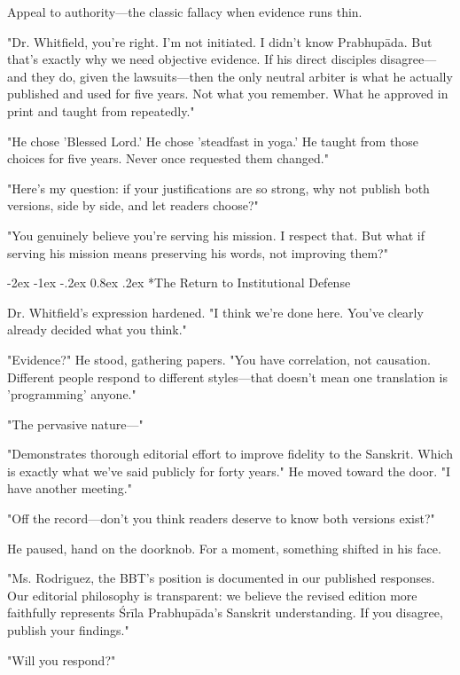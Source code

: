 \documentclass[12pt,twoside]{book}
\makeatletter
\let\oldsubsection\subsection
\renewcommand{\subsection}[1]{\needspace{3\baselineskip}\oldsubsection{#1}}
\renewcommand\subsection{\@startsection{subsection}{2}{\z@}%
{-2ex \@plus -1ex \@minus -.2ex}%
{0.8ex \@plus .2ex}%
{\normalfont\large\bfseries}}
\makeatother
\begin{document}
Appeal to authority—the classic fallacy when evidence runs thin.

"Dr. Whitfield, you're right. I'm not initiated. I didn't know Prabhupāda. But that's exactly why we need objective evidence. If his direct disciples disagree—and they do, given the lawsuits—then the only neutral arbiter is what he actually published and used for five years. Not what you remember. What he approved in print and taught from repeatedly."

"He chose 'Blessed Lord.' He chose 'steadfast in yoga.' He taught from those choices for five years. Never once requested them changed."

"Here's my question: if your justifications are so strong, why not publish both versions, side by side, and let readers choose?"

"You genuinely believe you're serving his mission. I respect that. But what if serving his mission means preserving his words, not improving them?"

\vspace{0.1cm}
\subsection*{The Return to Institutional Defense}

Dr. Whitfield's expression hardened. "I think we're done here. You've clearly already decided what you think."

"Evidence?" He stood, gathering papers. "You have correlation, not causation. Different people respond to different styles—that doesn't mean one translation is 'programming' anyone."

"The pervasive nature—"

"Demonstrates thorough editorial effort to improve fidelity to the Sanskrit. Which is exactly what we've said publicly for forty years." He moved toward the door. "I have another meeting."

"Off the record—don't you think readers deserve to know both versions exist?"

He paused, hand on the doorknob. For a moment, something shifted in his face.

"Ms. Rodriguez, the BBT's position is documented in our published responses. Our editorial philosophy is transparent: we believe the revised edition more faithfully represents Śrīla Prabhupāda's Sanskrit understanding. If you disagree, publish your findings."

"Will you respond?"
\end{document}
